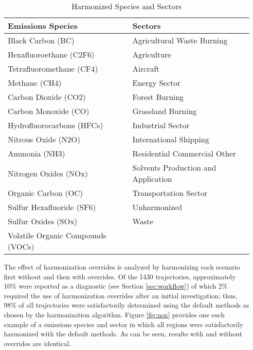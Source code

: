 \begin{table}[]
  \centering
  \caption{Harmonized Species and Sectors}
  \label{tab:sp}
  \begin{tabular}{|l|l|}
    \hline
    \textbf{Emissions Species}        & \textbf{Sectors}                    \\
    \hline
    Black Carbon (BC)                 & Agricultural Waste Burning          \\
    Hexafluoroethane (C2F6)           & Agriculture                         \\
    Tetrafluoromethane (CF4)          & Aircraft                            \\
    Methane (CH4)                     & Energy Sector                       \\
    Carbon Dioxide (CO2)              & Forest Burning                      \\
    Carbon Monoxide (CO)              & Grassland Burning                   \\
    Hydrofluorocarbons (HFCs)         & Industrial Sector                   \\
    Nitrous Oxide (N2O)               & International Shipping              \\
    Ammonia (NH3)                     & Residential Commercial Other        \\
    Nitrogen Oxides (NOx)             & Solvents Production and Application \\
    Organic Carbon (OC)               & Transportation Sector               \\
    Sulfur Hexafluoride (SF6)         & Unharmonized                        \\
    Sulfur Oxides (SOx)               & Waste                               \\
    Volatile Organic Compounds (VOCs) &                                     \\
    \hline
  \end{tabular}
\end{table}

The effect of harmonization overrides is analyzed by harmonizing each scenario
first without and then with overrides. Of the 1430 trajectories, approximately
10\% were reported as a diagnostic (see Section \ref{sec:workflow}) of which 2\%
required the use of harmonization overrides after an initial investigation;
thus, 98\% of all trajectories were satisfactorily determined using the default
methods as chosen by the harmonization algorithm. Figure \ref{fig:nox} provides
one such example of a emissions species and sector in which all regions were
satisfactorily harmonized with the default methods. As can be seen, results with
and without overrides are identical.

